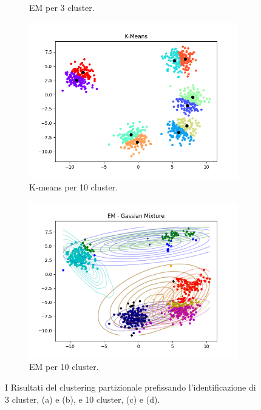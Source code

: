 \documentclass{llncs}
\begin{document}
\begin{figure}[h]
\begin{subfigure}{.5\textwidth}
		  \caption{EM per 3 cluster.}
		  \label{part:b}
		\end{subfigure}
		\begin{subfigure}{.5\textwidth}
			\centering
			\includegraphics[width=\linewidth]{immagini/5_clusters_kmeans_10.png}
			\caption{K-means per 10 cluster.}
			\label{part:c}			
		  \end{subfigure}
		  \begin{subfigure}{.5\textwidth}
			\centering
			\includegraphics[width=\linewidth]{immagini/5_clusters_gmm_10.png}
			\caption{EM per 10 cluster.}
			\label{part:d}			
		  \end{subfigure}
		\caption{I Risultati del clustering partizionale prefissando
		l'identificazione di 3 cluster, (a) e (b), e 10 cluster, (c) e (d).}
		\label{part:test}
	\end{figure}\\
\end{document}
